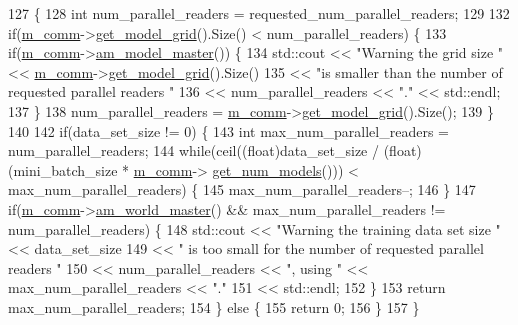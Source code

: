 \begin{DoxyCode}
127                                                                                                            
                                             \{
128   \textcolor{keywordtype}{int} num\_parallel\_readers = requested\_num\_parallel\_readers;
129 
132   \textcolor{keywordflow}{if}(\hyperlink{classlbann_1_1generic__io__buffer_a2e4a46c85c8b30e10b1cc5acaa2c4cca}{m\_comm}->\hyperlink{classlbann_1_1lbann__comm_a483bf8a72d44a0e83da45f3d47bd20d4}{get\_model\_grid}().Size() < num\_parallel\_readers) \{
133     \textcolor{keywordflow}{if}(\hyperlink{classlbann_1_1generic__io__buffer_a2e4a46c85c8b30e10b1cc5acaa2c4cca}{m\_comm}->\hyperlink{classlbann_1_1lbann__comm_ad8a5790dfa9191d4b4f889e8707e57f1}{am\_model\_master}()) \{
134         std::cout << \textcolor{stringliteral}{"Warning the grid size "} << \hyperlink{classlbann_1_1generic__io__buffer_a2e4a46c85c8b30e10b1cc5acaa2c4cca}{m\_comm}->\hyperlink{classlbann_1_1lbann__comm_a483bf8a72d44a0e83da45f3d47bd20d4}{get\_model\_grid}().Size()
135                   << \textcolor{stringliteral}{"is smaller than the number of requested parallel readers "}
136                   << num\_parallel\_readers << \textcolor{stringliteral}{"."} << std::endl;
137     \}
138     num\_parallel\_readers = \hyperlink{classlbann_1_1generic__io__buffer_a2e4a46c85c8b30e10b1cc5acaa2c4cca}{m\_comm}->\hyperlink{classlbann_1_1lbann__comm_a483bf8a72d44a0e83da45f3d47bd20d4}{get\_model\_grid}().Size();
139   \}
140 
142   \textcolor{keywordflow}{if}(data\_set\_size != 0) \{
143     \textcolor{keywordtype}{int} max\_num\_parallel\_readers = num\_parallel\_readers;
144     \textcolor{keywordflow}{while}(ceil((\textcolor{keywordtype}{float})data\_set\_size / (\textcolor{keywordtype}{float})(mini\_batch\_size * \hyperlink{classlbann_1_1generic__io__buffer_a2e4a46c85c8b30e10b1cc5acaa2c4cca}{m\_comm}->
      \hyperlink{classlbann_1_1lbann__comm_aeb8ef8f13bbb324e3e1f656998198f3f}{get\_num\_models}())) < max\_num\_parallel\_readers) \{
145       max\_num\_parallel\_readers--;
146     \}
147     \textcolor{keywordflow}{if}(\hyperlink{classlbann_1_1generic__io__buffer_a2e4a46c85c8b30e10b1cc5acaa2c4cca}{m\_comm}->\hyperlink{classlbann_1_1lbann__comm_a1ef526486183a29feadca9bef096a534}{am\_world\_master}() && max\_num\_parallel\_readers != num\_parallel\_readers) 
      \{
148       std::cout << \textcolor{stringliteral}{"Warning the training data set size "} << data\_set\_size
149                 << \textcolor{stringliteral}{" is too small for the number of requested parallel readers "}
150                 << num\_parallel\_readers << \textcolor{stringliteral}{", using "} << max\_num\_parallel\_readers << \textcolor{stringliteral}{"."}
151                 << std::endl;
152     \}
153     \textcolor{keywordflow}{return} max\_num\_parallel\_readers;
154   \} \textcolor{keywordflow}{else} \{
155     \textcolor{keywordflow}{return} 0;
156   \}
157 \}
\end{DoxyCode}
